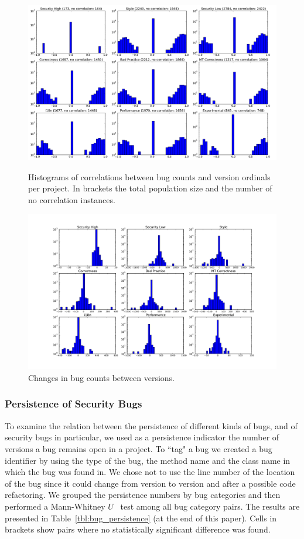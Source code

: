 \documentclass{sig-alternate}
\begin{document}
\begin{figure}[p]
  \centering
  \includegraphics[scale=0.30]{bugsversionscorr}
  \caption{Histograms of correlations between bug counts and version
    ordinals per project. In brackets the total population size and
    the number of no correlation instances.}
  \label{fig:bugsversionscorr}
  \centering
  \includegraphics[scale=0.35]{bugdiffs}
  \caption{Changes in bug counts between versions.}
  \label{fig:bugdiffs}
\end{figure}

\subsubsection{Persistence of Security Bugs}

To examine the relation between the persistence of different kinds of
bugs, and of security bugs in particular, we used as a persistence
indicator the number of versions a bug remains open in a project. To
``tag" a bug we created a bug identifier by using the type of the bug,
the method name and the class name in which the bug was found in. We
chose not to use the line number of the location of the bug since it
could change from version to version and after a possible code
refactoring. We grouped the persistence numbers by bug categories and
then performed a Mann-Whitney $U$~\cite{HM98} test among all bug
category pairs. The results are presented in
Table~\ref{tbl:bug_persistence} (at the end of this paper). Cells in
brackets show pairs where no statistically significant difference was
found.
\end{document}
